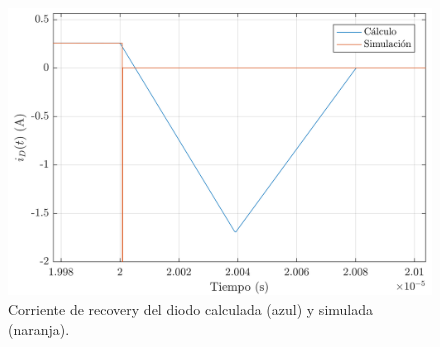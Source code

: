 \documentclass[e4_tp1_main.tex]{subfiles}
\begin{document}
\begin{figure}[th]
	\centering
	\includegraphics[scale=0.75]{images/ej2/id-recovery.png}
	\caption{Corriente de recovery del diodo calculada (azul) y simulada (naranja).}
	\label{fig:id-recovery}
\end{figure}
\end{document}
